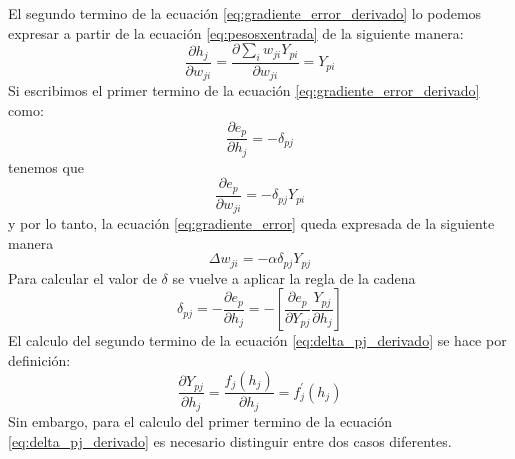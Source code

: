 \documentclass[12pt,letterpaper,oneside,openright]{book}
\begin{document}
 	El segundo termino de la ecuación \ref{eq:gradiente_error_derivado} lo podemos expresar a partir de la ecuación \ref{eq:pesosxentrada} de la siguiente manera:
 	\begin{equation}
 		\label{eq:2dotermino_gradi_derivado}
 		\frac{\partial h_j}{\partial w_{ji}} = \frac{\partial \sum_i w_{ji} Y_{pi}}{\partial w_{ji}} = Y_{pi}
 	\end{equation}
 	Si escribimos el primer termino de la ecuación \ref{eq:gradiente_error_derivado} como:
 	\begin{equation}
 		\label{eq:1ertermido_gradi_derivado_reescrito}
 		\frac{\partial e_p}{\partial h_j} = -\delta_{pj}
 	\end{equation}
 	tenemos que
 	\begin{equation}
 		\label{eq:gradi_error_sustituido}
 		\frac{\partial e_p}{\partial w_{ji}} = -\delta_{pj}Y_{pi}
 	\end{equation}
 	y por lo tanto, la ecuación \ref{eq:gradiente_error} queda expresada de la siguiente manera
 	\begin{equation}
 		\label{eq:gradiente_error_reescrito}
 		\Delta w_{ji} = -\alpha\delta_{pj}Y_{pj}
 	\end{equation}
 	Para calcular el valor de $\delta$ se vuelve a aplicar la regla de la cadena
 	\begin{equation}
 		\label{eq:delta_pj_derivado}
 		\delta_{pj} = -\frac{\partial e_p}{\partial h_j} = - \left[\frac{\partial e_p}{\partial Y_{pj}} \frac{Y_{pj}}{\partial h_j}\right]
 	\end{equation}
 	El calculo del segundo termino de la ecuación \ref{eq:delta_pj_derivado} se hace por definición:
 	\begin{equation}
 		\label{eq:2dotermino_calculo_definicion}
 		\frac{\partial Y_{pj}}{\partial h_j} = \frac{f_j (h_j)}{\partial h_j} = f_j^{'}(h_j)
 	\end{equation}
 	Sin embargo, para el calculo del primer termino de la ecuación \ref{eq:delta_pj_derivado} es necesario distinguir entre dos casos diferentes. 
\end{document}

